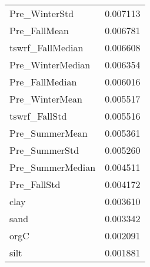 \begin{tabular}{lr}
Pre_WinterStd & 0.007113 \\
Pre_FallMean & 0.006781 \\
tswrf_FallMedian & 0.006608 \\
Pre_WinterMedian & 0.006354 \\
Pre_FallMedian & 0.006016 \\
Pre_WinterMean & 0.005517 \\
tswrf_FallStd & 0.005516 \\
Pre_SummerMean & 0.005361 \\
Pre_SummerStd & 0.005260 \\
Pre_SummerMedian & 0.004511 \\
Pre_FallStd & 0.004172 \\
clay & 0.003610 \\
sand & 0.003342 \\
orgC & 0.002091 \\
silt & 0.001881 \\
\bottomrule
\end{tabular}
